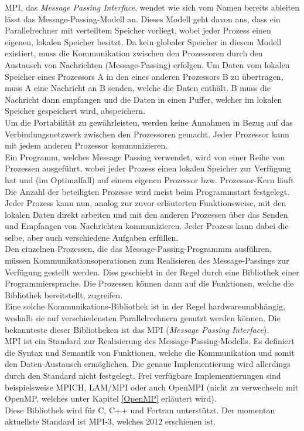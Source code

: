			MPI, das \textit{Message Passing Interface}, wendet wie sich vom Namen bereits ableiten lässt das Message-Passing-Modell an. Dieses Modell geht davon aus, dass ein Parallelrechner mit verteiltem Speicher vorliegt, wobei jeder Prozess einen eigenen, lokalen Speicher besitzt. Da kein globaler Speicher in diesem Modell existiert, muss die Kommunikation zwischen den Prozessoren durch den Austausch von Nachrichten (Message-Passing) erfolgen. Um Daten vom lokalen Speicher eines Prozessors A in den eines anderen Prozessors B zu übertragen, muss A eine Nachricht an B senden, welche die Daten enthält. B muss die Nachricht dann empfangen und die Daten in einen Puffer, welcher im lokalen Speicher gespeichert wird, abspeichern.\\
			Um die Portabilität zu gewährleisten, werden keine Annahmen in Bezug auf das Verbindungsnetzwerk zwischen den Prozessoren gemacht. Jeder Prozessor kann mit jedem anderen Prozessor kommunizieren.\\
			Ein Programm, welches Message Passing verwendet, wird von einer Reihe von Prozessen ausgeführt, wobei jeder Prozess einen lokalen Speicher zur Verfügung hat und (im Optimalfall) auf einem eigenen Prozessor bzw. Prozessor-Kern läuft. Die Anzahl der beteiligten Prozesse wird meist beim Programmstart festgelegt. Jeder Prozess kann nun, analog zur zuvor erläuterten Funktionsweise, mit den lokalen Daten direkt arbeiten und mit den anderen Prozessen über das Senden und Empfangen von Nachrichten kommunizieren. Jeder Prozess kann dabei die selbe, aber auch verschiedene Aufgaben erfüllen.\\
			Den einzelnen Prozessen, die das Message-Passing-Programmm ausführen, müssen Kommunikationsoperationen zum Realisieren des Message-Passings zur Verfügung gestellt werden. Dies geschieht in der Regel durch eine Bibliothek einer Programmiersprache. Die Prozessen können dann auf die Funktionen, welche die Bibliothek bereitstellt, zugreifen.\\
			Eine solche Kommunikations-Bibliothek ist in der Regel hardwareunabhängig, weshalb sie auf verschiedensten Parallelrechnern genutzt werden können. Die bekannteste dieser Bibliotheken ist das MPI (\textit{Message Passing Interface}).\\
			MPI ist ein Standard zur Realisierung des Message-Passing-Modells. Es definiert die Syntax und Semantik von Funktionen, welche die Kommunikation und somit den Daten-Austausch ermöglichen. Die genaue Implementierung wird allerdings durch den Standard nicht festgelegt. Frei verfügbare Implementierungen sind beispielsweise MPICH, LAM/MPI oder auch OpenMPI (nicht zu verwechseln mit OpenMP, welches unter Kapitel \ref{OpenMP} erläutert wird).\\
			Diese Bibliothek wird für C, C++ und Fortran unterstützt. Der momentan aktuellste Standard ist MPI-3, welches 2012 erschienen ist. \cite{ParaProgRauber}
			
